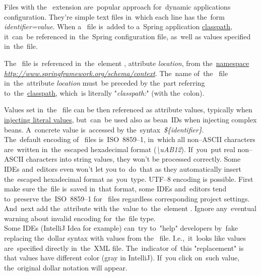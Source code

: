 Files with the~ extension are~popular approach for~dynamic applications configuration. They're simple text files in~which each line has the~form \textit{identifier=value}. When a~ file is~added to a~Spring application \hyperref[classpath]{classpath}, it~can~be referenced in~the~Spring configuration file, as~well as values specified in~the~file.

The~ file is~referenced in~the~element , attribute \textit{location}, from the~\hyperref[namespaces]{namespace} \textit{\href{http://www.springframework.org/schema/context}{http://www.springframework.org/schema/context}}. The~name of~the~ file in~the~attribute \textit{location} must~be preceded by the~part referring to~the~\hyperref[classpath]{classpath}, which~is literally "\textit{classpath:}" (with the~colon).

Values set in~the~ file can be then referenced as attribute values, typically when \hyperref[injectingliteralvalues]{injecting literal values}, but~can~be used also as bean~IDs when injecting complex beans. A~concrete value is~accessed by the~syntax~\textit{\$\{identifier\}}.\\

\warning The~default encoding of~ files is~\mbox{ISO~8859--1}, in~which all non--ASCII characters are~written in~the~escaped hexadecimal format (\textit{\textbackslash uAB12}). If~you~put real non--ASCII characters into string values, they won't be processed correctly. Some IDEs and~editors even won't let you to~do~that as they automatically insert the~escaped hexadecimal format as~you~type. UTF--8 encoding is possible. First make sure the~file is~saved in~that format, some IDEs and~editors tend to~preserve the~\mbox{ISO~8859--1} for~ files regardless corresponding project settings. And~next add the~attribute  with the~value  to~the~element . Ignore any~eventual warning about invalid encoding for~the~file type.\\

\warning Some IDEs (IntelliJ Idea for example) can~try to~"help" developers by~fake replacing the~dollar syntax with values from the~ file. I.e.,~it~looks like values are~specified directly in~the~XML file. The~indicator of~this "replacement" is that values have different color (gray in IntelliJ). If~you click on~such value, the~original dollar notation will appear.

